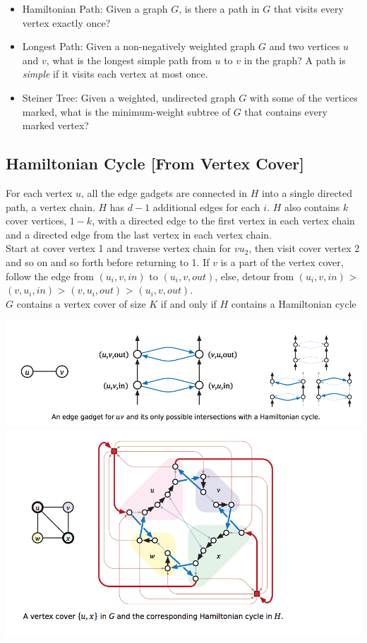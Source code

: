 \begin{itemize}
	\item Hamiltonian Path: Given a graph $G$, is there a path in $G$ that visits every vertex exactly once?
	\item Longest Path: Given a non-negatively weighted graph $G$ and two vertices $u$ and $v$, what is the longest simple path from $u$ to $v$ in the graph? A path is \emph{simple} if it visits each vertex at most once.
	\item Steiner Tree: Given a weighted, undirected graph $G$ with some of the vertices marked, what is the minimum-weight subtree of $G$ that contains every marked vertex?
\end{itemize}

\subsection{Hamiltonian Cycle [From Vertex Cover]}

For each vertex $u$, all the edge gadgets are connected in $H$ into a single directed path, a vertex chain. $H$ has $d-1$ additional edges for each $i$. $H$ also contains $k$ cover vertices, $1 - k$, with a directed edge to the first vertex in each vertex chain and a directed edge from the last vertex in each vertex chain.\\

Start at cover vertex 1 and traverse vertex chain for $vu_{2}$, then visit cover vertex 2 and so on and so forth before returning to 1. If $v$ is a part of the vertex cover, follow the edge from $(u_{i}, v, in)$ to $(u_{i}, v, out)$, else, detour from  $(u_{i}, v, in)$ > $(v, u_{i}, in)$ > $(v, u_{i}, out)$ > $(u_{i}, v, out)$.\\

$G$ contains a vertex cover of size $K$ if and only if $H$ contains a Hamiltonian cycle

\includegraphics[width=\linewidth]{images/edgegadget.png}
\includegraphics[width=\linewidth]{images/hamiltoniancycle.png}


